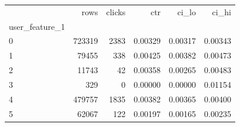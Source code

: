 \begin{tabular}{lrrrrr}
\toprule
 & rows & clicks & ctr & ci\_lo & ci\_hi \\
user\_feature\_1 &  &  &  &  &  \\
\midrule
0 & 723319 & 2383 & 0.00329 & 0.00317 & 0.00343 \\
1 & 79455 & 338 & 0.00425 & 0.00382 & 0.00473 \\
2 & 11743 & 42 & 0.00358 & 0.00265 & 0.00483 \\
3 & 329 & 0 & 0.00000 & 0.00000 & 0.01154 \\
4 & 479757 & 1835 & 0.00382 & 0.00365 & 0.00400 \\
5 & 62067 & 122 & 0.00197 & 0.00165 & 0.00235 \\
\bottomrule
\end{tabular}
